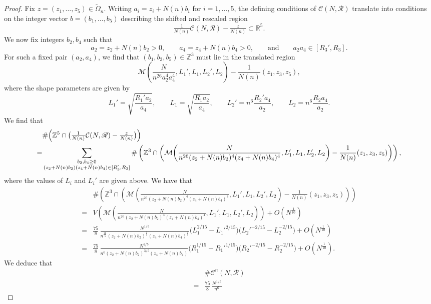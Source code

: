 \documentclass[table]{amsart}
\newcommand{\Z}{\mathbb{Z}}
\numberwithin{equation}{section}
\begin{document}
\begin{proof}
Fix $z=(z_1,\dots,z_5)\in\widetilde{\Omega}_n$. Writing
$a_i=z_i+N(n) b_i$ for $i=1,\dots,5$, the defining conditions of
$\mathcal{C}(N,\mathscr{R})$ translate into conditions on the integer vector
$b=(b_1,\dots,b_5)$ describing the shifted and rescaled region
\[
\tfrac{1}{N(n)}\mathcal{C}(N,\mathscr{R})-\tfrac{z}{N(n)}\subset\mathbb{R}^5.
\]
We now fix integers $b_2,b_4$ such that
\[
a_2=z_2+N(n) b_2>0,\qquad a_4=z_4+N(n) b_4>0,
\qquad\text{and}\qquad
a_2 a_4\in [R_3',R_3].
\]
For such a fixed pair $(a_2,a_4)$, we find that $(b_1,b_3,b_5)\in\mathbb{Z}^3$ must lie in the translated region
\[
\mathcal{M}\!\left(
\frac{N}{n^{26}a_2^4 a_4^4},
L_1',L_1,L_2',L_2
\right)
-
\frac{1}{N(n)}(z_1,z_3,z_5),
\]
where the shape parameters are given by
\[
L_1'=\sqrt{\frac{R_1' a_2}{a_4}},\qquad
L_1=\sqrt{\frac{R_1 a_2}{a_4}},\qquad
L_2'=n^6\frac{R_2' a_4}{a_2},\qquad
L_2=n^6\frac{R_2 a_4}{a_2}.
\]
We find that 
\[\begin{split}
&\#\Bigl(\mathbb{Z}^5\cap\bigl(\tfrac{1}{N(n)}\mathcal{C}(N,\mathscr{R})-\tfrac{z}{N(n)}\bigr)\Bigr)\\
=&\sum_{\substack{b_2,b_4\geq 0\\
(z_2+N(n)b_2)(z_4+N(n)b_4)\in [R_3', R_3]}}\# \left(\Z^3\cap\left(\mathcal{M}\!\left(
\frac{N}{n^{26}(z_2+N(n)b_2)^4 (z_4+N(n)b_4)^4},
L_1',L_1,L_2',L_2
\right)
-
\frac{1}{N(n)}(z_1,z_3,z_5)\right)\right),
\end{split}\]
where the values of $L_i$ and $L_i'$ are given above. We have that 
\[\begin{split}&\# \left(\Z^3\cap\left(\mathcal{M}\!\left(
\frac{N}{n^{26}(z_2+N(n)b_2)^4 (z_4+N(n)b_4)^4},
L_1',L_1,L_2',L_2
\right)
-
\frac{1}{N(n)}(z_1,z_3,z_5)\right)\right)\\
=& V\left(\mathcal{M}\!\left(
\frac{N}{n^{26}(z_2+N(n)b_2)^4 (z_4+N(n)b_4)^4},
L_1',L_1,L_2',L_2
\right)\right)+O(N^{\frac{1}{10}})\\
=& \frac{75}{8}\,\frac{N^{1/5}}{n^{\frac{26}{5}}(z_2+N(n)b_2)^{\frac{4}{5}} (z_4+N(n)b_4)^{\frac{4}{5}}}
\bigl(L_1^{2/15}-L_1'^{2/15}\bigr)
\bigl(L_2'^{-2/15}-L_2^{-2/15}\bigr)+O\left( N^{\frac{1}{10}}\right)\\
=&\frac{75}{8}\,\frac{N^{1/5}}{n^{6}(z_2+N(n)b_2)^{3/5} (z_4+N(n)b_4)}
\bigl(R_1^{1/15}-R_1'^{1/15}\bigr)
\bigl(R_2'^{-2/15}-R_2^{-2/15}\bigr)+O\left( N^{\frac{1}{10}}\right).
\end{split}\]
We deduce that 
\[\begin{split}&\#\mathcal{C}^n(N,\mathscr{R})\\
=&\frac{75}{8}\,\frac{N^{1/5}}{n^{6}}

\end{split}\]
\end{proof}
\end{document}
